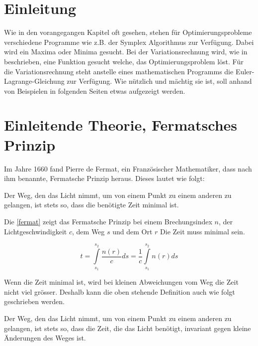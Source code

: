 \section{Einleitung}
Wie in den vorangegangen Kapitel oft gesehen, stehen für Optimierungsprobleme verschiedene Programme wie z.B. der Symplex Algorithmus zur Verfügung. Dabei wird ein Maxima oder Minima gesucht. Bei der Variationsrechnung wird, wie in  beschrieben, eine Funktion gesucht welche, das Optimierungsproblem löst. Für die Variationsrechnung steht anstelle eines mathematischen Programms die Euler-Lagrange-Gleichung zur Verfügung. Wie nützlich und mächtig sie ist, soll anhand von Beispielen in folgenden Seiten etwas aufgezeigt werden.

\section{Einleitende Theorie, Fermatsches Prinzip}

Im Jahre 1660 fand Pierre de Fermat, ein Französischer Mathematiker, dass  nach ihm benannte, Fermatsche Prinzip heraus. 
Dieses lautet wie folgt\cite{Definition}:

\begin{definition}
	Der Weg, den das Licht nimmt, 
	um von einem Punkt zu einem anderen zu gelangen, 
	ist stets so, dass die benötigte Zeit minimal ist.
\end{definition}

Die \eqref{fermat} zeigt das Fermatsche Prinzip bei einem Brechungsindex $n$, 
der Lichtgeschwindigkeit $c$, dem Weg $s$ und dem Ort $r$ Die Zeit muss minimal sein.

\begin{equation}
	t= \int\limits_{s_1}^{s_2} \frac{n(r)}{c} ds = \frac{1}{c} \int\limits_{s_1}^{s_2} n(r) ds
	\label{fermat}
\end{equation}


Wenn die Zeit minimal ist, wird bei kleinen Abweichungen vom Weg die Zeit nicht viel grösser. 
Deshalb kann die oben stehende Definition auch wie folgt geschrieben werden\cite{Definition}.

\begin{definition}
Der Weg, den das Licht nimmt,  um von einem Punkt zu einem anderen zu gelangen, 
ist stets so, dass die Zeit, die das Licht benötigt, invariant gegen kleine Änderungen des Weges ist.
\end{definition}

